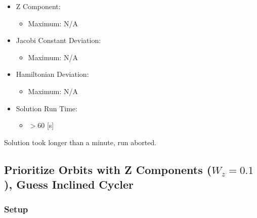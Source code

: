 \documentclass{article}
\begin{document}
\begin{itemize}
    \item Z Component:
    \begin{itemize}
        \item Maximum: N/A
    \end{itemize}
    \item Jacobi Constant Deviation:
    \begin{itemize}
        \item Maximum: N/A
    \end{itemize}
    \item Hamiltonian Deviation:
    \begin{itemize}
        \item Maximum: N/A
    \end{itemize}
    \item Solution Run Time:
    \begin{itemize}
        \item $>$60 [s]
    \end{itemize}  
\end{itemize}

Solution took longer than a minute, run aborted.

\newpage

\subsection{Prioritize Orbits with Z Components ($W_z = 0.1$), Guess Inclined Cycler}

\subsubsection{Setup}
\end{document}
